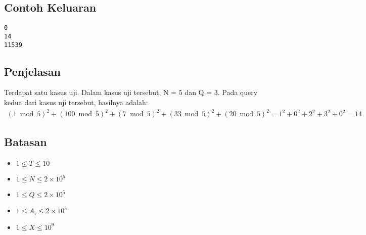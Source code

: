 \documentclass{article}
\begin{document}
\subsection*{Contoh Keluaran}
\begin{lstlisting}
0
14
11539
\end{lstlisting}

\subsection*{Penjelasan}

\par Terdapat satu kasus uji. Dalam kasus uji tersebut, N = 5 dan Q = 3. Pada query kedua dari kasus uji tersebut, hasilnya adalah:
\begin{gather*} 
(1 \bmod 5)^2 + (100 \bmod 5)^2 + (7 \bmod 5)^2 + (33 \bmod 5)^2 + (20 \bmod 5)^2 = 1^2 + 0^2 + 2^2 + 3^2 + 0^2 = 14
\end{gather*} 

\subsection*{Batasan}

\begin{itemize}
	\item $1 \leq T \leq 10$
	\item $1 \leq N \leq 2 \times 10^5$
	\item $1 \leq Q \leq 2 \times 10^5$
	\item $1 \leq A_i \leq 2 \times 10^5$
	\item $1 \leq X \leq 10^9$
\end{itemize}
\end{document}
